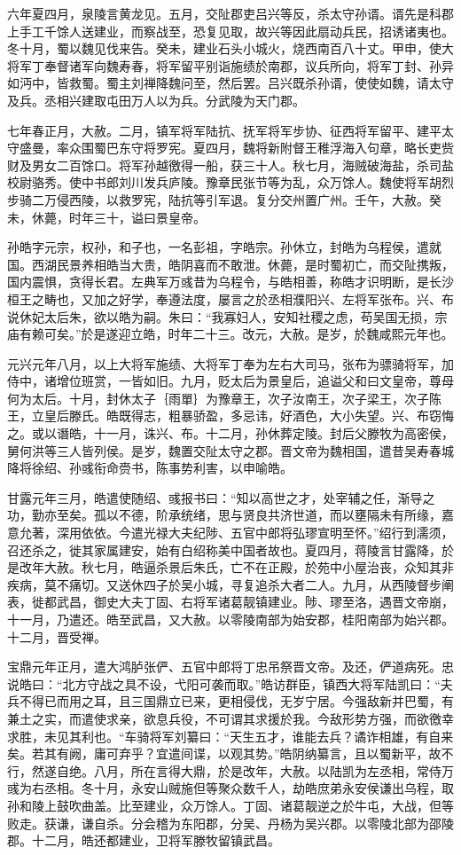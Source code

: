 \documentclass[12pt,UTF8]{ctexbook}
\begin{document}
六年夏四月，泉陵言黄龙见。五月，交阯郡吏吕兴等反，杀太守孙谞。谞先是科郡上手工千馀人送建业，而察战至，恐复见取，故兴等因此扇动兵民，招诱诸夷也。冬十月，蜀以魏见伐来告。癸未，建业石头小城火，烧西南百八十丈。甲申，使大将军丁奉督诸军向魏寿春，将军留平别诣施绩於南郡，议兵所向，将军丁封、孙异如沔中，皆救蜀。蜀主刘禅降魏问至，然后罢。吕兴既杀孙谞，使使如魏，请太守及兵。丞相兴建取屯田万人以为兵。分武陵为天门郡。

七年春正月，大赦。二月，镇军将军陆抗、抚军将军步协、征西将军留平、建平太守盛曼，率众围蜀巴东守将罗宪。夏四月，魏将新附督王稚浮海入句章，略长吏赀财及男女二百馀口。将军孙越徼得一船，获三十人。秋七月，海贼破海盐，杀司盐校尉骆秀。使中书郎刘川发兵庐陵。豫章民张节等为乱，众万馀人。魏使将军胡烈步骑二万侵西陵，以救罗宪，陆抗等引军退。复分交州置广州。壬午，大赦。癸未，休薨，时年三十，谥曰景皇帝。

孙皓字元宗，权孙，和子也，一名彭祖，字皓宗。孙休立，封皓为乌程侯，遣就国。西湖民景养相皓当大贵，皓阴喜而不敢泄。休薨，是时蜀初亡，而交阯携叛，国内震惧，贪得长君。左典军万彧昔为乌程令，与皓相善，称皓才识明断，是长沙桓王之畴也，又加之好学，奉遵法度，屡言之於丞相濮阳兴、左将军张布。兴、布说休妃太后朱，欲以皓为嗣。朱曰：“我寡妇人，安知社稷之虑，苟吴国无损，宗庙有赖可矣。”於是遂迎立皓，时年二十三。改元，大赦。是岁，於魏咸熙元年也。

元兴元年八月，以上大将军施绩、大将军丁奉为左右大司马，张布为骠骑将军，加侍中，诸增位班赏，一皆如旧。九月，贬太后为景皇后，追谥父和曰文皇帝，尊母何为太后。十月，封休太子｛雨單｝为豫章王，次子汝南王，次子梁王，次子陈王，立皇后滕氏。皓既得志，粗暴骄盈，多忌讳，好酒色，大小失望。兴、布窃悔之。或以谮皓，十一月，诛兴、布。十二月，孙休葬定陵。封后父滕牧为高密侯，舅何洪等三人皆列侯。是岁，魏置交阯太守之郡。晋文帝为魏相国，遣昔吴寿春城降将徐绍、孙彧衔命赍书，陈事势利害，以申喻皓。

甘露元年三月，皓遣使随绍、彧报书曰：“知以高世之才，处宰辅之任，渐导之功，勤亦至矣。孤以不德，阶承统绪，思与贤良共济世道，而以壅隔未有所缘，嘉意允著，深用依依。今遣光禄大夫纪陟、五官中郎将弘璆宣明至怀。”绍行到濡须，召还杀之，徙其家属建安，始有白绍称美中国者故也。夏四月，蒋陵言甘露降，於是改年大赦。秋七月，皓逼杀景后朱氏，亡不在正殿，於苑中小屋治丧，众知其非疾病，莫不痛切。又送休四子於吴小城，寻复追杀大者二人。九月，从西陵督步阐表，徙都武昌，御史大夫丁固、右将军诸葛靓镇建业。陟、璆至洛，遇晋文帝崩，十一月，乃遣还。皓至武昌，又大赦。以零陵南部为始安郡，桂阳南部为始兴郡。十二月，晋受禅。

宝鼎元年正月，遣大鸿胪张俨、五官中郎将丁忠吊祭晋文帝。及还，俨道病死。忠说皓曰：“北方守战之具不设，弋阳可袭而取。”皓访群臣，镇西大将军陆凯曰：“夫兵不得已而用之耳，且三国鼎立已来，更相侵伐，无岁宁居。今强敌新并巴蜀，有兼土之实，而遣使求亲，欲息兵役，不可谓其求援於我。今敌形势方强，而欲徼幸求胜，未见其利也。“车骑将军刘纂曰：“天生五才，谁能去兵？谲诈相雄，有自来矣。若其有阙，庸可弃乎？宜遣间谍，以观其势。”皓阴纳纂言，且以蜀新平，故不行，然遂自绝。八月，所在言得大鼎，於是改年，大赦。以陆凯为左丞相，常侍万彧为右丞相。冬十月，永安山贼施但等聚众数千人，劫皓庶弟永安侯谦出乌程，取孙和陵上鼓吹曲盖。比至建业，众万馀人。丁固、诸葛靓逆之於牛屯，大战，但等败走。获谦，谦自杀。分会稽为东阳郡，分吴、丹杨为吴兴郡。以零陵北部为邵陵郡。十二月，皓还都建业，卫将军滕牧留镇武昌。
\end{document}
